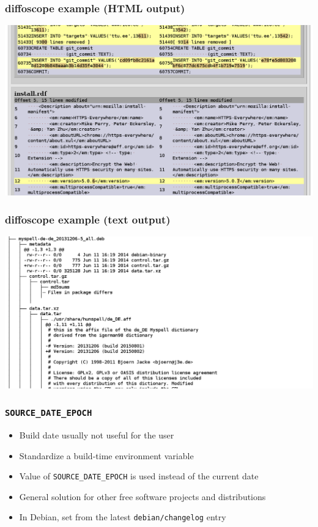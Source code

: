\documentclass[14pt]{beamer}
\begin{document}
\begin{frame}
 \frametitle{diffoscope example (HTML output)}

 \begin{center}
  \includegraphics[width=0.9\paperwidth]{images/diffoscope_example_html.png}
 \end{center}
\end{frame}

\begin{frame}
 \frametitle{diffoscope example (text output)}

 \begin{center}
  \includegraphics[width=0.9\paperwidth]{images/diffoscope_example_text.png}
 \end{center}
\end{frame}

\begin{frame}
 \frametitle{\texttt{SOURCE\_DATE\_EPOCH}}

 \begin{itemize}
  \item Build date usually not useful for the user
  \item Standardize a build-time environment variable
  \item Value of \texttt{SOURCE\_DATE\_EPOCH} is used instead of the current date
  \item General solution for other free software projects and distributions
  \item In Debian, set from the latest \texttt{debian/changelog} entry
 \end{itemize}
\end{frame}
\end{document}
